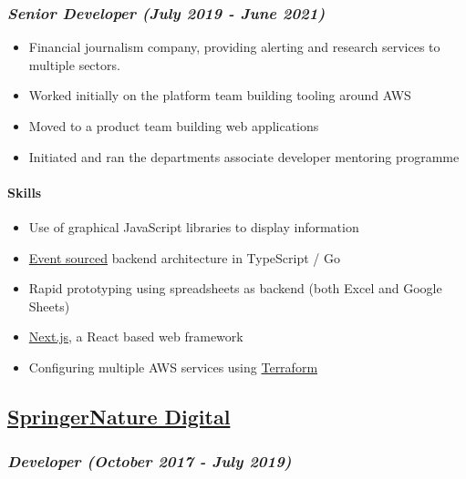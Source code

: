 \subsubsection{\texorpdfstring{\emph{Senior Developer (July 2019 - June
2021)}}{Senior Developer (July 2019 - June 2021)}}\label{senior-developer-june-2019---present}

\begin{itemize}
\tightlist
\item
  Financial journalism company, providing alerting and research services
  to multiple sectors.
\item
  Worked initially on the platform team building tooling around AWS
\item
  Moved to a product team building web applications
\item
  Initiated and ran the departments associate developer mentoring
  programme
\end{itemize}

\paragraph{Skills}\label{skills-0}

\begin{itemize}
\tightlist
\item
  Use of graphical JavaScript libraries to display information
\item
  \href{https://martinfowler.com/eaaDev/EventSourcing.html}{Event
  sourced} backend architecture in TypeScript / Go
\item
  Rapid prototyping using spreadsheets as backend (both Excel and Google
  Sheets)
\item
  \href{https://nextjs.org/}{Next.js}, a React based web framework
\item
  Configuring multiple AWS services using
  \href{https://www.terraform.io/}{Terraform}
\end{itemize}

\subsection{\texorpdfstring{\href{http://www.springernature.com}{SpringerNature
Digital}}{SpringerNature Digital}}\label{springernature-digital}

\subsubsection{\texorpdfstring{\emph{Developer (October 2017 - July
2019)}}{Developer (October 2017 - July 2019)}}\label{developer-october-2017---june-2019}

